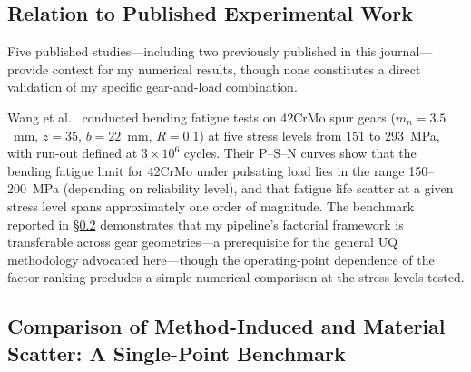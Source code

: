 \documentclass[12pt,a4paper]{article}
\begin{document}
\subsection{Relation to Published Experimental Work}

Five published studies---including two previously published in
this journal---provide context for my numerical results, though
none constitutes a direct validation of my specific
gear-and-load combination.

Wang et al.~\cite{wang2023} conducted bending fatigue tests on 42CrMo
spur gears ($m_n{=}3.5$~mm, $z{=}35$, $b{=}22$~mm, $R{=}0.1$) at five
stress levels from 151 to 293~MPa, with run-out defined at $3\times10^6$
cycles. Their P--S--N curves show that the bending fatigue limit for
42CrMo under pulsating load lies in the range 150--200~MPa (depending on
reliability level), and that fatigue life scatter at a given stress level
spans approximately one order of magnitude. The
benchmark reported in \S\ref{sec:method_dominates} demonstrates that
my pipeline's factorial framework is transferable across gear geometries---a
prerequisite for the general UQ methodology advocated here---though the
operating-point dependence of the factor ranking precludes a simple
numerical comparison at the stress levels tested.

\subsection{Comparison of Method-Induced and Material Scatter: A Single-Point Benchmark}
\label{sec:method_dominates}
\end{document}
